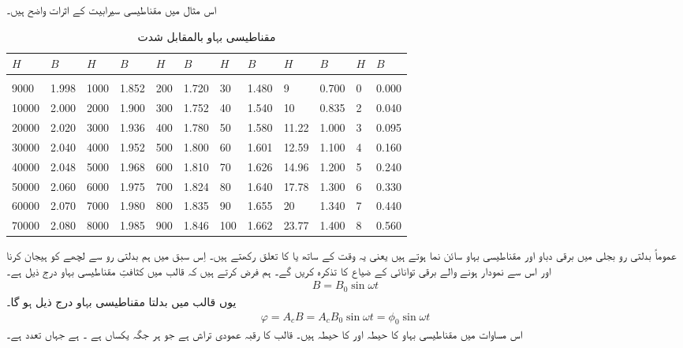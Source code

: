 اس مثال میں مقناطیسی سیرابیت کے اثرات واضح ہیں۔ 
%
\begin{table}
\begin{tabular}{l l l l   l l l l   l l l l}
$H$&$B$&$H$&$B$&$H$&$B$&$H$&$B$&$H$&$B$&$H$&$B$\\
\hline\\
9000&1.998&1000&1.852&           200&1.720 &30&1.480               &9&0.700&  0&0.000    \\
10000&2.000&2000&1.900&         300&1.752 &40&1.540           &10&0.835&  2&0.040    \\
20000&2.020&3000&1.936&         400&1.780 &50&1.580          &11.22&1.000&  3&0.095    \\
30000&2.040& 4000&1.952&        500&1.800 &60&1.601         &12.59&1.100 &  4&0.160    \\
40000&2.048&5000&1.968&         600&1.810 &70&1.626          &14.96&1.200&   5&0.240    \\
50000&2.060&6000&1.975&         700&1.824 &80&1.640         &17.78&1.300&  6&0.330    \\
60000&2.070&7000&1.980&         800&1.835  &90&1.655         &20&1.340&  7&0.440    \\
 70000&2.080&8000&1.985&        900&1.846 &100&1.662          &23.77&1.400& 8&0.560    \\
\hline
\end{tabular}
\caption{مقناطیسی بہاو بالمقابل شدت}
\label{جدول_مقناطیسی_ادوار_کثافت_بہاو_بالمقابل_شدت}
\end{table}
%

عموماً بدلتی رو بجلی میں برقی دباو اور مقناطیسی بہاو سائن نما ہوتے ہیں یعنی یہ وقت کے ساتھ  یا  کا تعلق رکھتے ہیں۔ اِس سبق میں ہم بدلتی رو سے لچھے کو ہیجان کرنا اور اس سے نمودار ہونے والے برقی توانائی  کے ضیاع  کا تذکرہ  کریں گے۔ ہم فرض کرتے ہیں کہ قالب میں کثافتِ مقناطیسی بہاو  درج ذیل ہے۔
\begin{align}
B=B_0 \sin \omega t
\end{align}
یوں قالب میں بدلتا مقناطیسی بہاو  درج ذیل ہو گا۔
\begin{align}
\varphi=A_c B=A_c B_0 \sin \omega t=\phi_0 \sin \omega t
\end{align}
اس مساوات میں مقناطیسی بہاو کا حیطہ   اور  کا حیطہ   ہیں۔ قالب کا رقبہ عمودی تراش ہے جو ہر جگہ یکساں ہے ۔ ہے جہاں  تعدد ہے۔

